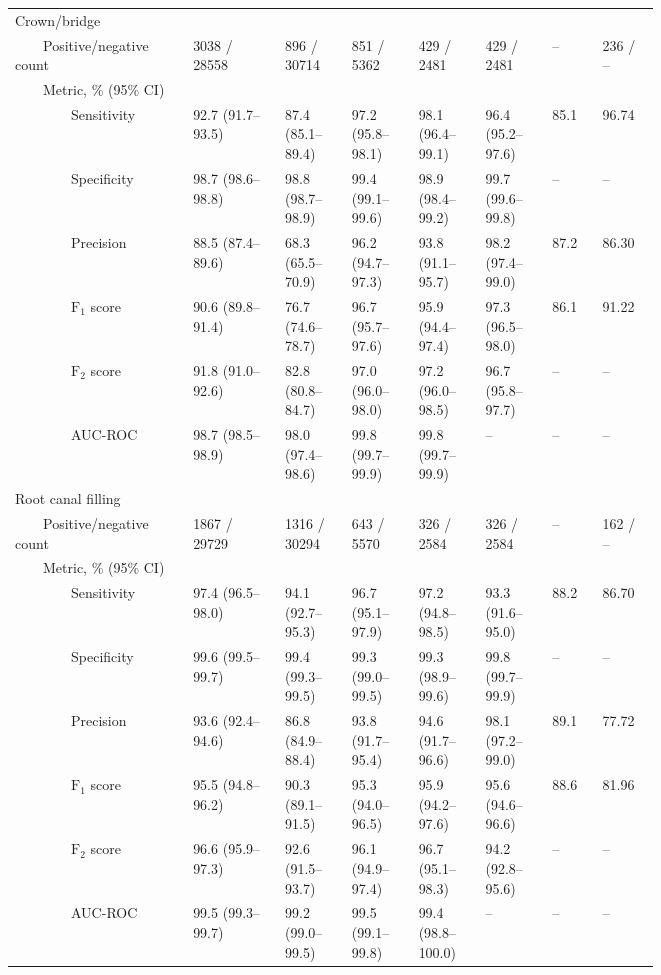 \begin{table}[!h]
\begin{tabular}{ p{0.167\linewidth}p{0.117\linewidth}p{0.083\linewidth}p{0.083\linewidth}p{0.083\linewidth}p{0.083\linewidth}|p{0.067\linewidth}p{0.067\linewidth} }
Crown/bridge &   &   &   &   &   &   &   \\
{~~~~}Positive/negative count & \num{3038} / \num{28558} & \num{896} / \num{30714} & \num{851} / \num{5362} & \num{429} / \num{2481} & \num{429} / \num{2481} & -- & \num{236} / -- \\
{~~~~}Metric, \% (95\% CI) &   &   &   &   &   &   &   \\
{~~~~~~~~}Sensitivity & 92.7 {(91.7--93.5)} & 87.4 {(85.1--89.4)} & 97.2 {(95.8--98.1)} & 98.1 {(96.4--99.1)} & 96.4 {(95.2--97.6)} & 85.1 & 96.74 \\
{~~~~~~~~}Specificity & 98.7 {(98.6--98.8)} & 98.8 {(98.7--98.9)} & 99.4 {(99.1--99.6)} & 98.9 {(98.4--99.2)} & 99.7 {(99.6--99.8)} & -- & -- \\
{~~~~~~~~}Precision & 88.5 {(87.4--89.6)} & 68.3 {(65.5--70.9)} & 96.2 {(94.7--97.3)} & 93.8 {(91.1--95.7)} & 98.2 {(97.4--99.0)} & 87.2 & 86.30 \\
{~~~~~~~~}$\textrm{F}_1$ score & 90.6 {(89.8--91.4)} & 76.7 {(74.6--78.7)} & 96.7 {(95.7--97.6)} & 95.9 {(94.4--97.4)} & 97.3 {(96.5--98.0)} & 86.1 & 91.22 \\
{~~~~~~~~}$\textrm{F}_2$ score & 91.8 {(91.0--92.6)} & 82.8 {(80.8--84.7)} & 97.0 {(96.0--98.0)} & 97.2 {(96.0--98.5)} & 96.7 {(95.8--97.7)} & -- & -- \\
{~~~~~~~~}AUC-ROC & 98.7 {(98.5--98.9)} & 98.0 {(97.4--98.6)} & 99.8 {(99.7--99.9)} & 99.8 {(99.7--99.9)} & -- & -- & -- \\ \midrule

Root canal filling &   &   &   &   &   &   &   \\
{~~~~}Positive/negative count & \num{1867} / \num{29729} & \num{1316} / \num{30294} & \num{643} / \num{5570} & \num{326} / \num{2584} & \num{326} / \num{2584} & -- & \num{162} / -- \\
{~~~~}Metric, \% (95\% CI) &   &   &   &   &   &   &   \\
{~~~~~~~~}Sensitivity & 97.4 {(96.5--98.0)} & 94.1 {(92.7--95.3)} & 96.7 {(95.1--97.9)} & 97.2 {(94.8--98.5)} & 93.3 {(91.6--95.0)} & 88.2 & 86.70 \\
{~~~~~~~~}Specificity & 99.6 {(99.5--99.7)} & 99.4 {(99.3--99.5)} & 99.3 {(99.0--99.5)} & 99.3 {(98.9--99.6)} & 99.8 {(99.7--99.9)} & -- & -- \\
{~~~~~~~~}Precision & 93.6 {(92.4--94.6)} & 86.8 {(84.9--88.4)} & 93.8 {(91.7--95.4)} & 94.6 {(91.7--96.6)} & 98.1 {(97.2--99.0)} & 89.1 & 77.72 \\
{~~~~~~~~}$\textrm{F}_1$ score & 95.5 {(94.8--96.2)} & 90.3 {(89.1--91.5)} & 95.3 {(94.0--96.5)} & 95.9 {(94.2--97.6)} & 95.6 {(94.6--96.6)} & 88.6 & 81.96 \\
{~~~~~~~~}$\textrm{F}_2$ score & 96.6 {(95.9--97.3)} & 92.6 {(91.5--93.7)} & 96.1 {(94.9--97.4)} & 96.7 {(95.1--98.3)} & 94.2 {(92.8--95.6)} & -- & -- \\
{~~~~~~~~}AUC-ROC & 99.5 {(99.3--99.7)} & 99.2 {(99.0--99.5)} & 99.5 {(99.1--99.8)} & 99.4 {(98.8--100.0)} & -- & -- & -- \\ \midrule


\end{tabular}
\end{table}
